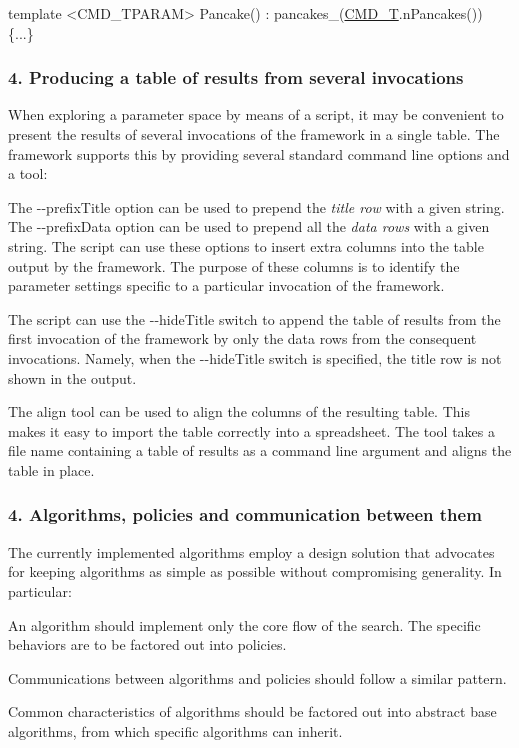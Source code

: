 \begin{DoxyCode}
\textcolor{keyword}{template} <CMD\_TPARAM>
Pancake() : pancakes\_(\hyperlink{command__line_8h_ad2bdd5f5511ceff17570c461fe447a56}{CMD\_T}.nPancakes()) \{...\}
\end{DoxyCode}
\hypertarget{index_s-single}{}\subsubsection{4. Producing a table of results from several invocations}\label{index_s-single}
When exploring a parameter space by means of a script, it may be convenient to present the results of several invocations of the framework in a single table. The framework supports this by providing several standard command line options and a tool\+:
\begin{DoxyItemize}
\item The {\ttfamily -\/-\/prefix\+Title} option can be used to prepend the {\itshape title row} with a given string. The {\ttfamily -\/-\/prefix\+Data} option can be used to prepend all the {\itshape data rows} with a given string. The script can use these options to insert extra columns into the table output by the framework. The purpose of these columns is to identify the parameter settings specific to a particular invocation of the framework.
\item The script can use the {\ttfamily -\/-\/hide\+Title} switch to append the table of results from the first invocation of the framework by only the data rows from the consequent invocations. Namely, when the {\ttfamily -\/-\/hide\+Title} switch is specified, the title row is not shown in the output.
\item The {\ttfamily align} tool can be used to align the columns of the resulting table. This makes it easy to import the table correctly into a spreadsheet. The tool takes a file name containing a table of results as a command line argument and aligns the table in place.
\end{DoxyItemize}\hypertarget{index_s-crtp}{}\subsubsection{4. Algorithms, policies and communication between them}\label{index_s-crtp}
The currently implemented algorithms employ a design solution that advocates for keeping algorithms as simple as possible without compromising generality. In particular\+:
\begin{DoxyItemize}
\item An algorithm should implement only the core flow of the search. The specific behaviors are to be factored out into policies.
\item Communications between algorithms and policies should follow a similar pattern.
\item Common characteristics of algorithms should be factored out into abstract base algorithms, from which specific algorithms can inherit.
\end{DoxyItemize}

